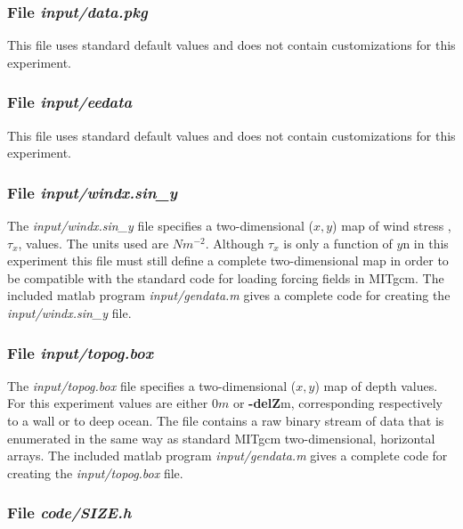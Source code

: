 \subsubsection{File {\it input/data.pkg}}
\label{www:tutorials}

This file uses standard default values and does not contain
customizations for this experiment.

\subsubsection{File {\it input/eedata}}
\label{www:tutorials}

This file uses standard default values and does not contain
customizations for this experiment.

\subsubsection{File {\it input/windx.sin\_y}}
\label{www:tutorials}

The {\it input/windx.sin\_y} file specifies a two-dimensional ($x,y$) 
map of wind stress ,$\tau_{x}$, values. The units used are $Nm^{-2}$.
Although $\tau_{x}$ is only a function of $y$n in this experiment
this file must still define a complete two-dimensional map in order
to be compatible with the standard code for loading forcing fields 
in MITgcm. The included matlab program {\it input/gendata.m} gives a complete
code for creating the {\it input/windx.sin\_y} file.

\subsubsection{File {\it input/topog.box}}
\label{www:tutorials}


The {\it input/topog.box} file specifies a two-dimensional ($x,y$) 
map of depth values. For this experiment values are either
$0m$ or {\bf -delZ}m, corresponding respectively to a wall or to deep
ocean. The file contains a raw binary stream of data that is enumerated
in the same way as standard MITgcm two-dimensional, horizontal arrays.
The included matlab program {\it input/gendata.m} gives a complete
code for creating the {\it input/topog.box} file.

\subsubsection{File {\it code/SIZE.h}}
\label{www:tutorials}

